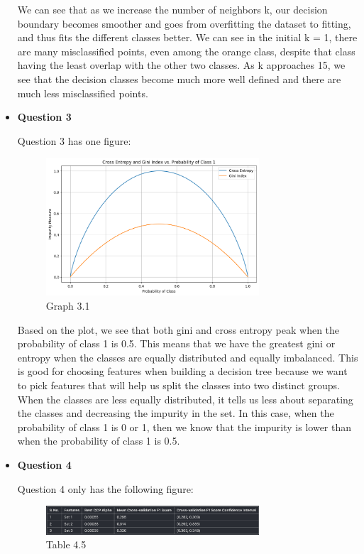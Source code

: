 \documentclass[12pt]{article}
\begin{document}
\begin{itemize}
  We can see that as we increase the number of neighbors k, our decision boundary becomes smoother and goes from overfitting the dataset to fitting, and thus fits the different classes better. 
  We can see in the initial k = 1, there are many misclassified points, even among the orange class, despite that class having the least overlap with the other two classes. As k approaches 15, we see that the decision classes become much more well defined and there are much less misclassified points.

  \item \textbf{Question 3}
  
  Question 3 has one figure: \\ 
  \begin{figure} [H]
    \centering 
    \includegraphics[width=0.75\textwidth]{3_1.png}
    \caption{Graph 3.1}
    \label{fig:graph3.1}
  \end{figure}

  Based on the plot, we see that both gini and cross entropy peak when the probability of class 1 is 0.5. This means that we have the greatest gini or entropy when the classes are equally distributed and equally imbalanced. This is good for choosing features when building a decision tree because we want to pick 
  features that will help us split the classes into two distinct groups. When the classes are less equally distributed, it tells us less about separating the classes and decreasing the impurity in the set. In this case, when the probability of class 1 is 0 or 1, then we know that the impurity is lower than when the probability of class 1 is 0.5.
  

  \item \textbf{Question 4}
  
  Question 4 only has the following figure: \\ 


  \begin{figure}[H]
    \centering
    \includegraphics[width=0.75\textwidth]{4_5.png}
    \caption{Table 4.5}
    \label{fig:graph4.5}
  \end{figure}


\end{itemize}
\end{document}

